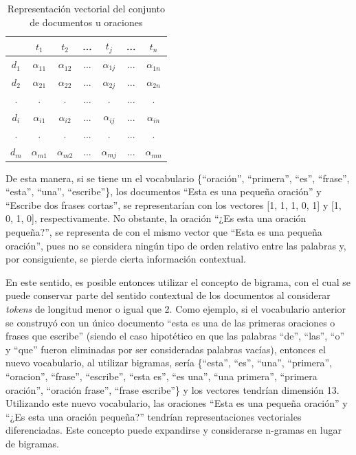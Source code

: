 \documentclass[conference]{IEEEtran}
\begin{document}
        \begin{table}[]
            \centering
            \caption{Representación vectorial del conjunto de documentos u oraciones}
            \label{tab:vectores1}
            \begin{tabular}{c|cccccc}
                       & $t_1$         & $t_2$         & ... & $t_j$         & ... & $t_n$\\ \hline
                $d_1$  & $\alpha_{11}$ & $\alpha_{12}$ & ... & $\alpha_{1j}$ & ... & $\alpha_{1n}$\\
                $d_2$  & $\alpha_{21}$ & $\alpha_{22}$ & ... & $\alpha_{2j}$ & ... & $\alpha_{2n}$\\
                .  & .             & .             & ... & .             & ... & . \\
                $d_i$  & $\alpha_{i1}$ & $\alpha_{i2}$ & ... & $\alpha_{ij}$ & ... & $\alpha_{in}$ \\
                .  & .             & .             & ... & .             & ... & . \\
                $d_m$  & $\alpha_{m1}$ & $\alpha_{m2}$ & ... & $\alpha_{mj}$ & ... & $\alpha_{mn}$
            \end{tabular}
        \end{table}
    
        De esta manera, si se tiene un el vocabulario \{``oración'', ``primera'', ``es'', ``frase'', ``esta'', ``una'', ``escribe''\}, los documentos ``Esta es una pequeña oración'' y ``Escribe dos frases cortas'', se representarían con los vectores [1, 1, 1, 0, 1] y [1, 0, 1, 0], respectivamente. No obstante, la oración ``¿Es esta una oración pequeña?'', se representa de con el mismo vector que ``Esta es una pequeña oración'', pues no se considera ningún tipo de orden relativo entre las palabras y, por consiguiente, se pierde cierta información contextual.
        
        En este sentido, es posible entonces utilizar el concepto de bigrama, con el cual se puede conservar parte del sentido contextual de los documentos al considerar \textit{tokens} de longitud menor o igual que 2. Como ejemplo, si el vocabulario anterior se construyó con un único documento ``esta es una de las primeras oraciones o frases que escribe'' (siendo el caso hipotético en que las palabras ``de'', ``las'', ``o'' y ``que'' fueron eliminadas por ser consideradas palabras vacías), entonces el nuevo vocabulario, al utilizar bigramas, sería \{``esta'', ``es'', ``una'', ``primera'', ``oracion'', ``frase'', ``escribe'', ``esta es'', ``es una'', ``una primera'', ``primera oración'', ``oración frase'', ``frase escribe''\} y los vectores tendrían dimensión 13. Utilizando este nuevo vocabulario, las oraciones ``Esta es una pequeña oración'' y ``¿Es esta una oración pequeña?'' tendrían representaciones vectoriales diferenciadas. Este concepto puede expandirse y considerarse n-gramas en lugar de bigramas.
        
\end{document}
